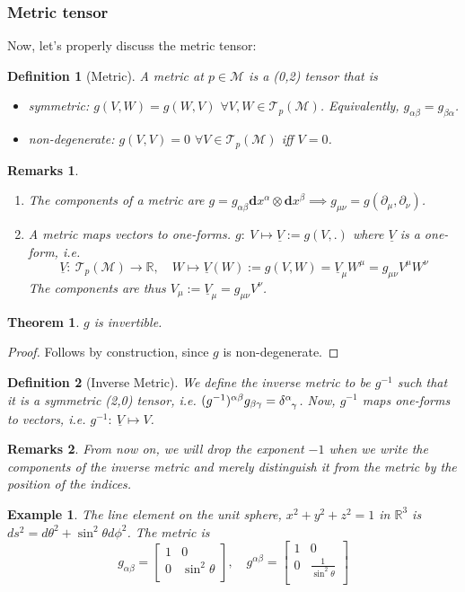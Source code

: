 \documentclass[a4paper]{article}
\newtheorem{eg}{Example}[section]
\newtheorem{remarks}{Remarks}[section]
\theoremstyle{new}
\newtheorem{defi}{Definition}[section]
\newtheorem{thm}{Theorem}[section]
\begin{document}
\subsubsection{Metric tensor}
Now, let's properly discuss the metric tensor:
\begin{defi}[Metric]
A metric at $p\in\mathcal{M}$ is a (0,2) tensor that is
\begin{itemize}
    \item symmetric: $g(V,W)=g(W,V)$
    $\forall V,W\in\mathcal{T}_p(\mathcal{M})$. Equivalently, $g_{\alpha\beta}=g_{\beta\alpha}$.
    \item non-degenerate:
    $g(V,V)=0$     $\forall V\in\mathcal{T}_p(\mathcal{M})$ iff $V=0$.
\end{itemize}
\end{defi}
\begin{remarks}\leavevmode
\begin{enumerate}
    \item The components of a metric are $g=g_{\alpha\beta}\mathbf{d}x^\alpha\otimes\mathbf{d}x^\beta\implies g_{\mu\nu}=g(\partial_\mu,\partial_\nu)$.
    \item A metric maps vectors to one-forms. $g:~V\mapsto \underline{V}:=g(V,.)$ where $\underline{V}$ is a one-form, i.e.
$$\underline{V}:~\mathcal{T}_p(\mathcal{M})\rightarrow\mathbb{R},\quad W\mapsto\underline{V}(W):=g(V,W)=\underline{V}_\mu W^\mu=g_{\mu\nu}V^\mu W^\nu$$
    The components are thus $V_\mu:=\underline{V}_\mu=g_{\mu\nu}V^\nu$.
    \end{enumerate}
\end{remarks}
\begin{thm}
$g$ is invertible.
\end{thm}
\begin{proof}
Follows by construction, since $g$ is non-degenerate.
\end{proof}
\begin{defi}[Inverse Metric]
We define the inverse metric to be $g^{-1}$ such that it is a symmetric (2,0) tensor, i.e. $(g^{-1})^{\alpha\beta}g_{\beta\gamma}=\tensor*{\delta}{*_{}^{\alpha}_{\gamma}}$. Now,  $g^{-1}$ maps one-forms to vectors, i.e. $g^{-1}:~\underline{V}\mapsto V$.
\end{defi}
\begin{remarks}
From now on, we will drop the exponent $−1$ when we write the components of the inverse metric and merely distinguish it from the metric by the position of the indices.
\end{remarks}
\begin{eg}
The line element on the unit sphere, $x^2+y^2+z^2=1$ in $\mathbb{R}^3$ is $ds^2=d\theta^2+\sin^2\theta d\phi^2$. The metric is
$$g_{\alpha\beta}=\begin{bmatrix}1&0\\0&\sin^2\theta\\\end{bmatrix},\quad g^{\alpha\beta}=\begin{bmatrix}1&0\\0&\frac{1}{\sin^2\theta}\\\end{bmatrix}$$
\end{eg}
\end{document}
